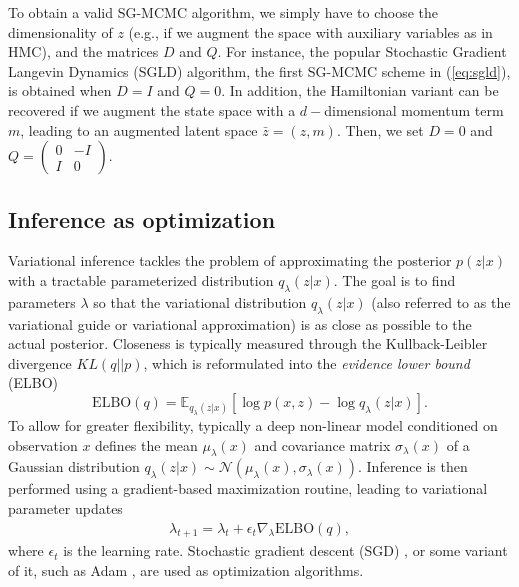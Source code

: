 To obtain a valid SG-MCMC algorithm, we simply have to choose the dimensionality of ${z}$ (e.g., if we augment the space with auxiliary variables as in HMC), and the matrices ${D}$ and ${Q}$. For instance, the popular Stochastic Gradient Langevin Dynamics (SGLD) algorithm, the first SG-MCMC scheme in (\ref{eq:sgld}), is obtained when ${D} = {I}$ and ${Q} = {0}$. In addition, the Hamiltonian variant can be recovered if we augment the state space with a $d-$dimensional momentum term ${m}$, leading to an augmented latent space $ \bar{{z}} = ({z}, {m})$. Then, we set ${D} = {0}$ and ${Q} = \begin{pmatrix}
{0} & -{I} \\
{I} & {0}
\end{pmatrix}$.


\subsection{Inference as optimization}\label{sec:iasopt}


Variational inference \parencite{kucukelbir2017automatic} tackles the problem of approximating the posterior $p({z} | {x})$ with a tractable parameterized distribution $q_{{\lambda}}({z}|{x})$. The goal is to find parameters ${\lambda}$ so that the variational distribution $q_{{\lambda}}({z}|{x})$ (also referred to as the variational guide or variational approximation) is as close as possible to the actual posterior. Closeness is typically measured through the
Kullback-Leibler 
divergence $KL(q || p)$, which is reformulated into the \emph{evidence lower bound} (ELBO) 
\begin{equation}\label{eq:elbo_bayes}
\mbox{ELBO}(q) = \mathbb{E}_{q_{{\lambda}}({z}|{x})} \left[ \log p({x},{z}) - \log q_{{\lambda}}({z}|{x})\right].
\end{equation}
To allow 
for greater flexibility, typically a deep non-linear model conditioned on observation ${x}$ defines the mean $\mu_{{\lambda}}({x})$ and covariance matrix $\sigma_{{\lambda}}({x})$ of a
Gaussian distribution $q_{{\lambda}}({z}|{x}) \sim \mathcal{N}(\mu_{{\lambda}}({x}), \sigma_{{\lambda}}({x}))$.
Inference is then performed using a gradient-based maximization routine, leading to variational parameter updates
\begin{align*}
{\lambda}_{t+1} = {\lambda}_t +  \epsilon_t \nabla_{{\lambda}} \mbox{ELBO}(q),
\end{align*}
where $\epsilon_t$ is the learning rate. Stochastic gradient descent (SGD) \parencite{hoffman2013stochastic}, or some variant of it, such as Adam \parencite{kingma2014adam}, are used as optimization algorithms.

